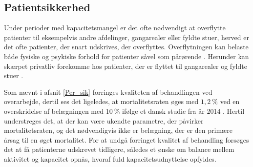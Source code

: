 

\subsection{Patientsikkerhed}
Under perioder med kapacitetsmangel er det ofte nødvendigt at overflytte patienter til eksempelvis andre afdelinger, gangarealer eller fyldte stuer, herved er det ofte patienter, der snart udskrives, der overflyttes.  Overflytningen kan belaste både fysiske og psykiske forhold for patienter såvel som pårørende \cite{Heidmann2014}. Herunder kan skærpet privatliv forekomme hos patienter, der er flyttet til gangarealer og fyldte stuer \cite{Madsen2014}. 

Som nævnt i afsnit \ref{Per_sik} forringes kvaliteten af behandlingen ved overarbejde, dertil ses det ligeledes, at mortalitetsraten øges med $1,2~\%$ ved en overskridelse af belægningen med $10~\%$ ifølge et dansk studie fra år 2014 \cite{Madsen2014}. Hertil understreges det, at der kan være ukendte parametre, der påvirker mortalitetsraten, og det nødvendigvis ikke er belægning, der er den primære årsag til en øget mortalitet. For at undgå forringet kvalitet af behandling forsøges det at få patienterne udskrevet tidligere, således et ønske om balance mellem aktivitet og kapacitet opnås, hvoraf fuld kapacitetsudnyttelse opfyldes.


